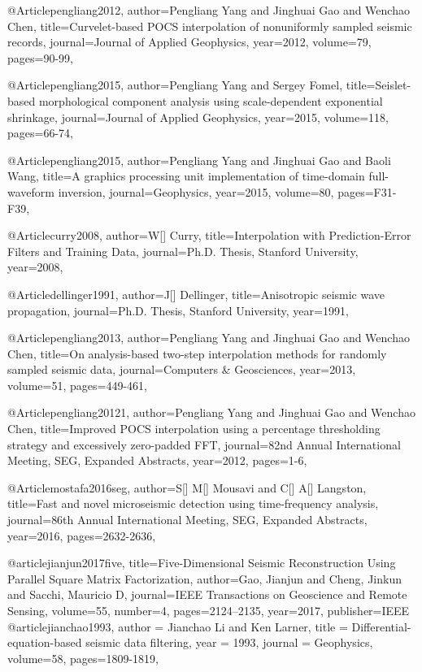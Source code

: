 @Article{pengliang2012,
  author={Pengliang Yang and Jinghuai Gao and Wenchao Chen},
  title={Curvelet-based {POCS} interpolation of nonuniformly sampled seismic records},
  journal={Journal of Applied Geophysics},
  year=2012,
  volume=79,
  pages={90-99},
}

@Article{pengliang2015,
  author={Pengliang Yang and Sergey Fomel},
  title={Seislet-based morphological component analysis using scale-dependent exponential shrinkage},
  journal={Journal of Applied Geophysics},
  year=2015,
  volume=118,
  pages={66-74},
}

@Article{pengliang2015,
  author={Pengliang Yang and Jinghuai Gao and Baoli Wang},
  title={A graphics processing unit implementation of time-domain full-waveform inversion},
  journal={Geophysics},
  year=2015,
  volume=80,
  pages={F31-F39},
}

@Article{curry2008,
  author={W[] Curry},
  title={Interpolation with Prediction-Error Filters and Training Data},
  journal={Ph.D. Thesis, Stanford University},
  year=2008,
}

@Article{dellinger1991,
  author={J[] Dellinger},
  title={Anisotropic seismic wave propagation},
  journal={Ph.D. Thesis, Stanford University},
  year=1991,
}

@Article{pengliang2013,
  author={Pengliang Yang and Jinghuai Gao and Wenchao Chen},
  title={On analysis-based two-step interpolation methods for randomly sampled seismic data},
  journal={Computers \& Geosciences},
  year=2013,
  volume=51,
  pages={449-461},
}

@Article{pengliang20121,
  author={Pengliang Yang and Jinghuai Gao and Wenchao Chen},
  title={Improved {POCS} interpolation using a percentage thresholding strategy and excessively zero-padded FFT},
  journal={82nd Annual International Meeting, SEG, Expanded Abstracts},
  year=2012,
  pages={1-6},
}


@Article{mostafa2016seg,
  author={S[] M[] Mousavi and C[] A[] Langston},
  title={Fast and novel microseismic detection using time-frequency analysis},
  journal={86th Annual International Meeting, SEG, Expanded Abstracts},
  year=2016,
  pages={2632-2636},
}

@article{jianjun2017five,
  title={Five-Dimensional Seismic Reconstruction Using Parallel Square Matrix Factorization},
  author={Gao, Jianjun and Cheng, Jinkun and Sacchi, Mauricio D},
  journal={IEEE Transactions on Geoscience and Remote Sensing},
  volume={55},
  number={4},
  pages={2124--2135},
  year={2017},
  publisher={IEEE}
}
@article{jianchao1993,
  author =	 {Jianchao Li and Ken Larner},
  title =	 {Differential-equation-based seismic data filtering},
  year =	 1993,
  journal =	 {Geophysics},
  volume={58},
 pages=1809-1819,
}

